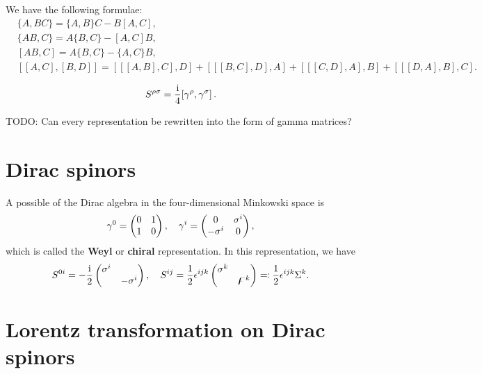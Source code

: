 \documentclass[hyperref, a4paper]{article}
\newcommand*{\ii}{\mathrm{i}}
\newcommand*{\concept}[1]{{\textbf{#1}}}
\begin{document}
\begin{note*}{}{}
    We have the following formulae:
    \[
        \begin{aligned}
            &\{A,BC\}=\{A,B\}C-B[A,C], \\ 
            &\{AB,C\}=A\{B,C\}-[A,C]B, \\ 
            &[AB,C]=A\{B,C\}-\{A,C\}B, \\
            &[[A,C],[B,D]]=[[[A,B],C],D]+[[[B,C],D],A]+[[[C,D],A],B]+[[[D,A],B],C].
        \end{aligned}
    \]
\end{note*}

\begin{equation}
    S^{\rho \sigma} = \frac{\ii}{4} \comm*{\gamma^\rho}{\gamma^\sigma}.
\end{equation}

TODO: Can every representation be rewritten into the form of gamma matrices?

\section{Dirac spinors}

A possible of the Dirac algebra in the four-dimensional Minkowski space is
\begin{equation}
    \gamma^0 = \pmqty{0 & 1 \\ 1 & 0}, \quad \gamma^i = \pmqty{ 0 & \sigma^i \\ - \sigma^i & 0 },
\end{equation}
which is called the \concept{Weyl} or \concept{chiral} representation. In this representation, we have 
\begin{equation}
    S^{0 i} = - \frac{\ii}{2} \pmqty{\dmat{\sigma^i, - \sigma^i}}, \quad 
    S^{ij} = \frac{1}{2} \epsilon^{ijk} \pmqty{\dmat{\sigma^k, \digamma^k}} \eqqcolon \frac{1}{2} \epsilon^{ijk} \Sigma^k.
    \label{eq:weyl-lorentz}
\end{equation}

\section{Lorentz transformation on Dirac spinors}
\end{document}
